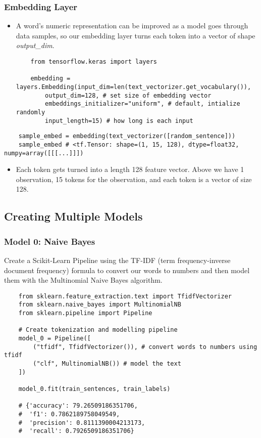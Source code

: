 \documentclass[11pt, a4paper]{article}
\begin{document}
	\subsubsection{Embedding Layer}
	\begin{itemize}
		\item A word's numeric representation can be improved as a model goes through data samples, so our embedding layer turns each token into a vector of shape \textit{output\_dim}.
	\begin{lstlisting}
	from tensorflow.keras import layers
	
	embedding = layers.Embedding(input_dim=len(text_vectorizer.get_vocabulary()),
		output_dim=128, # set size of embedding vector
		embeddings_initializer="uniform", # default, intialize randomly
		input_length=15) # how long is each input \end{lstlisting}
	\end{itemize} \newpage


	\begin{lstlisting}
	sample_embed = embedding(text_vectorizer([random_sentence]))
	sample_embed # <tf.Tensor: shape=(1, 15, 128), dtype=float32, numpy=array([[[...]]])\end{lstlisting}
	\begin{itemize}
		\item Each token gets turned into a length 128 feature vector. Above we have 1 observation, 15 tokens for the observation, and each token is a vector of size 128.
	\end{itemize}

	\subsection{Creating Multiple Models}
	\subsubsection{Model 0: Naive Bayes}
	Create a Scikit-Learn Pipeline using the TF-IDF (term frequency-inverse document frequency) formula to convert our words to numbers and then model them with the Multinomial Naive Bayes algorithm. 
	\begin{lstlisting}
	from sklearn.feature_extraction.text import TfidfVectorizer
	from sklearn.naive_bayes import MultinomialNB
	from sklearn.pipeline import Pipeline
	
	# Create tokenization and modelling pipeline
	model_0 = Pipeline([
		("tfidf", TfidfVectorizer()), # convert words to numbers using tfidf
		("clf", MultinomialNB()) # model the text
	])
	
	model_0.fit(train_sentences, train_labels)
	
	# {'accuracy': 79.26509186351706,
	#  'f1': 0.7862189758049549,
	#  'precision': 0.8111390004213173,
	#  'recall': 0.7926509186351706} \end{lstlisting}
\end{document}
